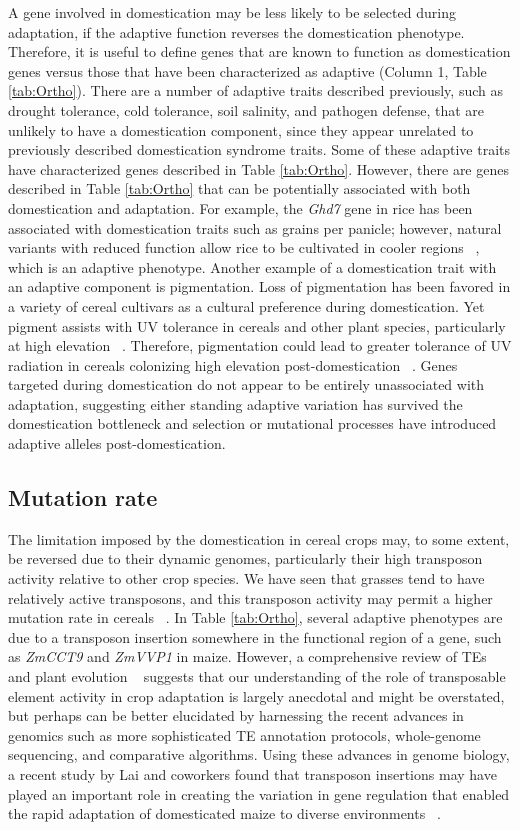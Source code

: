 \documentclass[12pt]{article}
\begin{document}
A gene involved in domestication may be less likely to be selected during adaptation, if the adaptive function reverses the domestication phenotype. 
Therefore, it is useful to define genes that are known to function as domestication genes versus those that have been characterized as adaptive (Column 1, Table \ref{tab:Ortho}).
There are a number of adaptive traits described previously, such as drought tolerance, cold tolerance, soil salinity, and pathogen defense, that are unlikely to have a domestication component, since they appear unrelated to previously described domestication syndrome traits.
Some of these adaptive traits have characterized genes described in Table \ref{tab:Ortho}.
However, there are genes described in Table \ref{tab:Ortho} that can be potentially associated with both domestication and adaptation.
For example, the \emph{Ghd7} gene in rice has been associated with domestication traits such as grains per panicle; however, natural variants with reduced function allow rice to be cultivated in cooler regions ~\citep{Xue2008}, which is an adaptive phenotype. 
Another example of a domestication trait with an adaptive component is pigmentation.
Loss of pigmentation has been favored in a variety of cereal cultivars as a cultural preference during domestication.
Yet pigment assists with UV tolerance in cereals and other plant species, particularly at high elevation ~\citep{pmid8058838, Gould2004}.
Therefore, pigmentation could lead to greater tolerance of UV radiation in cereals colonizing high elevation post-domestication ~\citep{Pyhjrvi2013}.
Genes targeted during domestication do not appear to be entirely unassociated with adaptation, suggesting either standing adaptive variation has survived the domestication bottleneck and selection or mutational processes have introduced adaptive alleles post-domestication.

\subsection*{Mutation rate}
The limitation imposed by the domestication in cereal crops may, to some extent, be reversed due to their dynamic genomes, particularly their high transposon activity relative to other crop species. 
We have seen that grasses tend to have relatively active transposons, and this transposon activity may permit a higher mutation rate in cereals ~\citep{Wicker2016}. 
In Table \ref{tab:Ortho}, several adaptive phenotypes are due to a transposon insertion somewhere in the functional region of a gene, such as \textit{ZmCCT9} and \textit{ZmVVP1} in maize.
However, a comprehensive review of TEs and plant evolution ~\citep{Lisch2013} suggests that our understanding of the role of transposable element activity in crop adaptation is largely anecdotal and might be overstated, but perhaps can be better elucidated by harnessing the recent advances in genomics such as more sophisticated TE annotation protocols, whole-genome sequencing, and comparative algorithms.
Using these advances in genome biology, a recent study by Lai and coworkers found that transposon insertions may have played an important role in creating the variation in gene regulation that enabled the rapid adaptation of domesticated maize to diverse environments ~\citep{Lai2017}.
\end{document}
